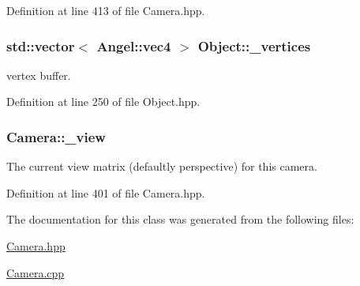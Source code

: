 Definition at line 413 of file Camera.\-hpp.

\hypertarget{class_object_a4ac354b3ec284f27358b1d4b8d95b9a9}{
\subsubsection[{\-\_\-vertices}]{\setlength{\rightskip}{0pt plus 5cm}std\-::vector$<$ {\bf Angel\-::vec4} $>$ Object\-::\-\_\-vertices\hspace{0.3cm}{\ttfamily [inherited]}}}\label{class_object_a4ac354b3ec284f27358b1d4b8d95b9a9}


vertex buffer. 



Definition at line 250 of file Object.\-hpp.

\hypertarget{class_camera_a28f6e710df6db726568cd0f2bbd3643a}{
\subsubsection[{\-\_\-view}]{ Camera\-::\-\_\-view\hspace{0.3cm}{\ttfamily [private]}}}\label{class_camera_a28f6e710df6db726568cd0f2bbd3643a}


The current view matrix (defaultly perspective) for this camera. 



Definition at line 401 of file Camera.\-hpp.



The documentation for this class was generated from the following files\-:\begin{DoxyCompactItemize}
\item 
\hyperlink{_camera_8hpp}{Camera.\-hpp}\item 
\hyperlink{_camera_8cpp}{Camera.\-cpp}\end{DoxyCompactItemize}
